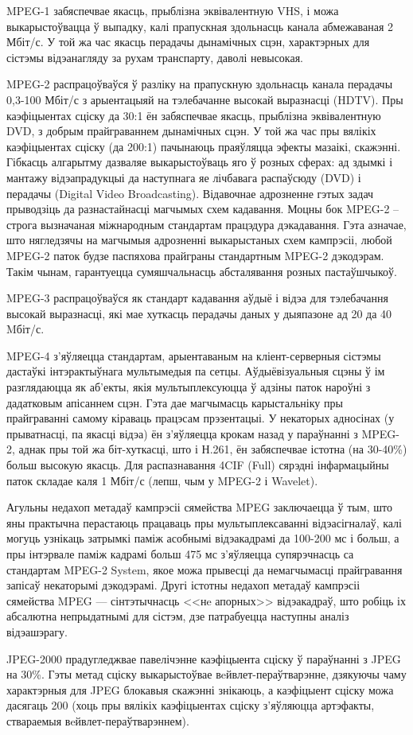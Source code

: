 MPEG-1 забяспечвае якасць, прыблізна эквівалентную VHS, і можа выкарыстоўвацца ў выпадку, калі прапускная здольнасць канала абмежаваная 2 Мбіт/с. У той жа час якасць перадачы дынамічных сцэн, характэрных для сістэмы відэанагляду за рухам транспарту, даволі невысокая.

MPEG-2 распрацоўваўся ў разліку на прапускную здольнасць канала перадачы 0,3-100 Мбіт/с з арыентацыяй на тэлебачанне высокай выразнасці (HDTV). Пры каэфіцыентах сціску да 30:1 ён забяспечвае якасць, прыблізна эквівалентную DVD, з добрым прайграваннем дынамічных сцэн. У той жа час пры вялікіх каэфіцыентах сціску (да 200:1) пачынаюць праяўляцца эфекты мазаікі, скажэнні. Гібкасць алгарытму дазваляе выкарыстоўваць яго ў розных сферах: ад здымкі і мантажу відэапрадукцыі да наступнага яе лічбавага распаўсюду (DVD) і перадачы (Digital Video Broadcasting). Відавочнае адрозненне гэтых задач прыводзіць да разнастайнасці магчымых схем кадавання. Моцны бок MPEG-2 -- строга вызначаная міжнародным стандартам працэдура дэкадавання. Гэта азначае, што нягледзячы на магчымыя адрозненні выкарыстаных схем кампрэсіі, любой MPEG-2 паток будзе паспяхова прайграны стандартным MPEG-2 дэкодэрам. Такім чынам, гарантуецца сумяшчальнасць абсталявання розных пастаўшчыкоў.

MPEG-3 распрацоўваўся як стандарт кадавання аўдыё і відэа для тэлебачання высокай выразнасці, які мае хуткасць перадачы даных у дыяпазоне ад 20 да 40 Mбіт/с.

MPEG-4 з'яўляецца стандартам, арыентаваным на кліент-серверныя сістэмы дастаўкі інтэрактыўнага мультымедыя па сетцы. Аўдыёвізуальныя сцэны ў ім разглядаюцца як аб'екты, якія мультыплексуюцца ў адзіны паток нароўні з дадатковым апісаннем сцэн. Гэта дае магчымасць карыстальніку пры прайграванні самому кіраваць працэсам прэзентацыі. У некаторых адносінах (у прыватнасці, па якасці відэа) ён з'яўляецца крокам назад у параўнанні з MPEG-2, аднак пры той жа біт-хуткасці, што і Н.261, ён забяспечвае істотна (на 30-40\%) больш высокую якасць. Для распазнавання 4CIF (Full) сярэдні інфармацыйны паток складае каля 1 Мбіт/с (лепш, чым у MPEG-2 і Wavelet).

Агульны недахоп метадаў кампрэсіі сямейства MPEG заключаецца ў тым, што яны прак\-тыч\-на перастаюць працаваць пры мультыплексаванні відэасігналаў, калі могуць узнікаць затрымкі паміж асобнымі відэакадрамі да 100-200 мс і больш, а пры інтэрвале паміж кадрамі больш 475 мс з'яўляецца супярэчнасць са стандартам MPEG-2 System, якое можа прывесці да немагчымасці прайгравання запісаў некаторымі дэкодэрамі. Другі істотны недахоп метадаў кам\-прэ\-сіі сямейства MPEG --- сінтэтычнасць <<нe апорных>> відэакадраў, што робіць іх аб\-са\-лют\-на непрыдатнымі для сістэм, дзе патрабуецца наступны аналіз відэашэрагу.

JPEG-2000 прадугледжвае павелічэнне каэфіцыента сціску ў параўнанні з JPEG на 30\%. Гэты метад сціску выкарыстоўвае вeйвлет-пераўтварэнне, дзякуючы чаму характэрныя для JPEG блокавыя скажэнні знікаюць, а каэфіцыент сціску можа дасягаць 200 (хоць пры вялікіх каэфіцыентах сціску з'яўляюцца артэфакты, ствараемыя вeйвлет-пераўтварэннем).
